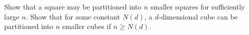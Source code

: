 Show that a square may be partitioned into $n$ smaller squares for sufficiently large $n$.
Show that for some constant $N(d)$, a $d$-dimensional cube can be partitioned into $n$ smaller cubes if $n \geq N(d) $.